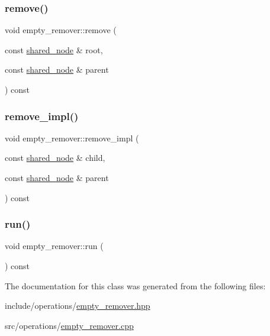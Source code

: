 \subsubsection{\texorpdfstring{remove()}{remove()}}
{\footnotesize\ttfamily void empty\+\_\+remover\+::remove (\begin{DoxyParamCaption}\item[{const \hyperlink{namespacejawe_a3f307481d921b6cbb50cc8511fc2b544}{shared\+\_\+node} \&}]{root,  }\item[{const \hyperlink{namespacejawe_a3f307481d921b6cbb50cc8511fc2b544}{shared\+\_\+node} \&}]{parent }\end{DoxyParamCaption}) const\hspace{0.3cm}{\ttfamily [private]}}

\mbox{\label{classjawe_1_1empty__remover_a4e97d479ce5a67b38fe904b7ab017f94}} 
\subsubsection{\texorpdfstring{remove\+\_\+impl()}{remove\_impl()}}
{\footnotesize\ttfamily void empty\+\_\+remover\+::remove\+\_\+impl (\begin{DoxyParamCaption}\item[{const \hyperlink{namespacejawe_a3f307481d921b6cbb50cc8511fc2b544}{shared\+\_\+node} \&}]{child,  }\item[{const \hyperlink{namespacejawe_a3f307481d921b6cbb50cc8511fc2b544}{shared\+\_\+node} \&}]{parent }\end{DoxyParamCaption}) const\hspace{0.3cm}{\ttfamily [private]}}

\mbox{\label{classjawe_1_1empty__remover_af369f9e6202276fc09d8b21271916c7e}} 
\subsubsection{\texorpdfstring{run()}{run()}}
{\footnotesize\ttfamily void empty\+\_\+remover\+::run (\begin{DoxyParamCaption}{ }\end{DoxyParamCaption}) const}



The documentation for this class was generated from the following files\+:\begin{DoxyCompactItemize}
\item 
include/operations/\hyperlink{empty__remover_8hpp}{empty\+\_\+remover.\+hpp}\item 
src/operations/\hyperlink{empty__remover_8cpp}{empty\+\_\+remover.\+cpp}\end{DoxyCompactItemize}
